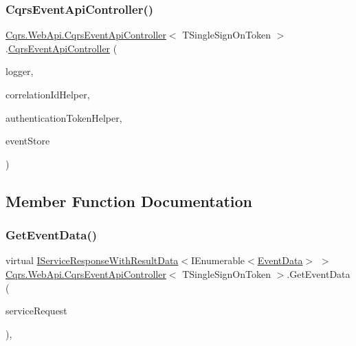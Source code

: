 \subsubsection{\texorpdfstring{Cqrs\+Event\+Api\+Controller()}{CqrsEventApiController()}}
{\footnotesize\ttfamily \hyperlink{classCqrs_1_1WebApi_1_1CqrsEventApiController}{Cqrs.\+Web\+Api.\+Cqrs\+Event\+Api\+Controller}$<$ T\+Single\+Sign\+On\+Token $>$.\hyperlink{classCqrs_1_1WebApi_1_1CqrsEventApiController}{Cqrs\+Event\+Api\+Controller} (\begin{DoxyParamCaption}\item[{I\+Logger}]{logger,  }\item[{I\+Correlation\+Id\+Helper}]{correlation\+Id\+Helper,  }\item[{\hyperlink{interfaceCqrs_1_1Authentication_1_1IAuthenticationTokenHelper}{I\+Authentication\+Token\+Helper}$<$ T\+Single\+Sign\+On\+Token $>$}]{authentication\+Token\+Helper,  }\item[{\hyperlink{interfaceCqrs_1_1Events_1_1IEventStore}{I\+Event\+Store}$<$ T\+Single\+Sign\+On\+Token $>$}]{event\+Store }\end{DoxyParamCaption})\hspace{0.3cm}{\ttfamily [protected]}}



\subsection{Member Function Documentation}
\mbox{\label{classCqrs_1_1WebApi_1_1CqrsEventApiController_aac0079ced115761a0ab605eaebe0801b}} 
\subsubsection{\texorpdfstring{Get\+Event\+Data()}{GetEventData()}}
{\footnotesize\ttfamily virtual \hyperlink{interfaceCqrs_1_1Services_1_1IServiceResponseWithResultData}{I\+Service\+Response\+With\+Result\+Data}$<$I\+Enumerable$<$\hyperlink{classCqrs_1_1Events_1_1EventData}{Event\+Data}$>$ $>$ \hyperlink{classCqrs_1_1WebApi_1_1CqrsEventApiController}{Cqrs.\+Web\+Api.\+Cqrs\+Event\+Api\+Controller}$<$ T\+Single\+Sign\+On\+Token $>$.Get\+Event\+Data (\begin{DoxyParamCaption}\item[{\hyperlink{interfaceCqrs_1_1Services_1_1IServiceRequestWithData}{I\+Service\+Request\+With\+Data}$<$ T\+Single\+Sign\+On\+Token, Guid $>$}]{service\+Request }\end{DoxyParamCaption})\hspace{0.3cm}{\ttfamily [protected]}, {\ttfamily [virtual]}}



